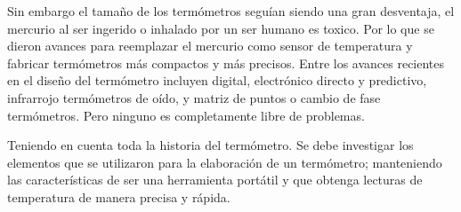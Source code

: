 \par \noindent
Sin embargo el tamaño de los termómetros seguían siendo una gran desventaja, el mercurio al ser ingerido o inhalado por un ser humano es toxico. Por lo que se dieron avances para reemplazar el mercurio como sensor de temperatura y fabricar termómetros más compactos y más precisos. Entre los avances recientes en el diseño del termómetro incluyen digital, electrónico directo y predictivo, infrarrojo termómetros de oído, y matriz de puntos o cambio de fase termómetros. Pero ninguno es completamente libre de problemas.\cite{intro-historia}

\par \noindent
Teniendo en cuenta toda la historia del termómetro. Se debe investigar los elementos que se utilizaron para la elaboración de un termómetro; manteniendo las características de ser una herramienta portátil y que obtenga lecturas de temperatura de manera precisa y rápida.